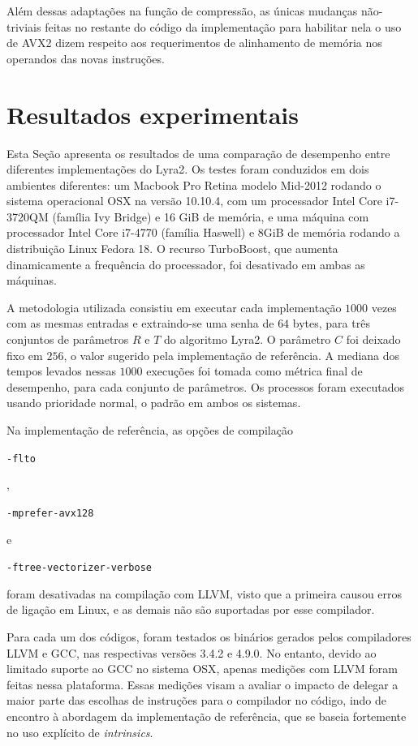\documentclass{article}
\begin{document}
Além dessas adaptações na função de compressão, as únicas mudanças
não-triviais feitas no restante do código da implementação para
habilitar nela o uso de AVX2 dizem respeito aos requerimentos de
alinhamento de memória nos operandos das novas instruções.

\section{Resultados experimentais }
\label{sec-experimental}

Esta Seção apresenta os resultados de uma comparação de desempenho entre
diferentes implementações do Lyra2. Os testes foram conduzidos em
dois ambientes diferentes: um Macbook Pro Retina modelo Mid-2012 rodando
o sistema operacional OSX na versão 10.10.4, com um processador Intel
Core i7-3720QM (família Ivy Bridge) e 16 GiB de memória, e uma máquina
com processador Intel Core i7-4770 (família Haswell) e 8GiB de memória
rodando a distribuição Linux Fedora 18. O recurso TurboBoost, que
aumenta dinamicamente a frequência do processador, foi desativado em
ambas as máquinas.

A metodologia utilizada consistiu em executar cada implementação
$1000$ vezes com as mesmas entradas e extraindo-se uma senha de $64$
bytes, para três conjuntos de parâmetros $R$ e $T$ do algoritmo
Lyra2. O parâmetro $C$ foi deixado fixo em $256$, o valor sugerido
pela implementação de referência. A mediana dos tempos levados nessas
$1000$ execuções foi tomada como métrica final de desempenho, para
cada conjunto de parâmetros. Os processos foram executados usando
prioridade normal, o padrão em ambos os sistemas.

Na implementação de referência, as opções de compilação
\begin{small}\verb|-flto|\end{small},
\begin{small}\verb|-mprefer-avx128|\end{small} e
\begin{small}\verb|-ftree-vectorizer-verbose|\end{small} foram desativadas na
compilação com LLVM, visto que a primeira causou erros de ligação em Linux, e
as demais não são suportadas por esse compilador.

Para cada um dos códigos, foram testados os binários gerados pelos
compiladores LLVM e GCC, nas respectivas versões 3.4.2 e 4.9.0. No
entanto, devido ao limitado suporte ao GCC no sistema OSX, apenas
medições com LLVM foram feitas nessa plataforma. Essas medições visam a
avaliar o impacto de delegar a maior parte das escolhas de instruções
para o compilador no código, indo de encontro à abordagem da
implementação de referência, que se baseia fortemente no uso explícito
de \emph{intrinsics}.
\end{document}
